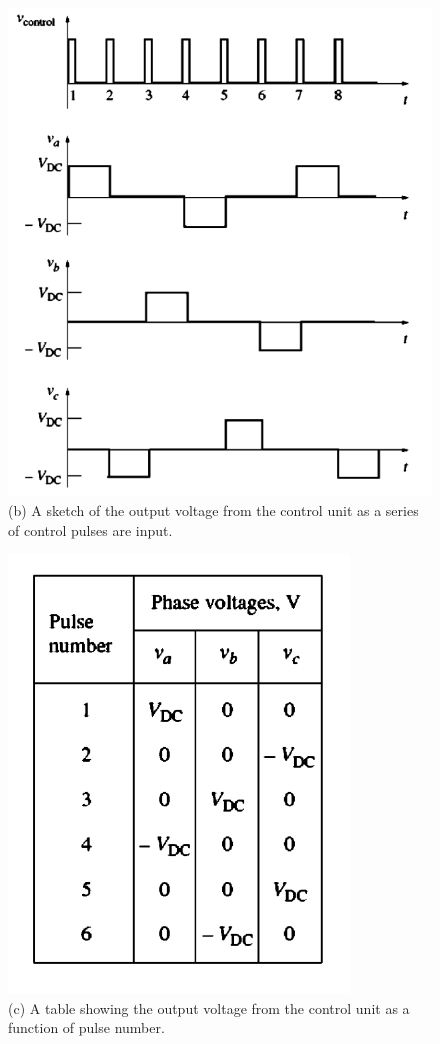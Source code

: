 \documentclass[journal]{IEEEtran}
\begin{document}
\begin{figure}[h]
    \centering
    \includegraphics[scale=0.32]{Stepper/fig 10-38-b.PNG}
    \caption{(b) A sketch of the output voltage from the control unit as a series of control pulses are input. }
    \label{fig:Stepper 10-38-b}
\end{figure}

\begin{figure}[h]
    \centering
    \includegraphics[scale=0.45]{Stepper/fig 10-38-c.PNG}
    \caption{(c) A table showing the output voltage from the control unit as a function of pulse number.}
    \label{fig:Stepper 10-38-c}
\end{figure}
\end{document}
